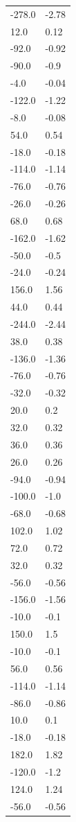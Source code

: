 \begin{longtable}{ll}
-278.0 & -2.78 \\
12.0 & 0.12 \\
-92.0 & -0.92 \\
-90.0 & -0.9 \\
-4.0 & -0.04 \\
-122.0 & -1.22 \\
-8.0 & -0.08 \\
54.0 & 0.54 \\
-18.0 & -0.18 \\
-114.0 & -1.14 \\
-76.0 & -0.76 \\
-26.0 & -0.26 \\
68.0 & 0.68 \\
-162.0 & -1.62 \\
-50.0 & -0.5 \\
-24.0 & -0.24 \\
156.0 & 1.56 \\
44.0 & 0.44 \\
-244.0 & -2.44 \\
38.0 & 0.38 \\
-136.0 & -1.36 \\
-76.0 & -0.76 \\
-32.0 & -0.32 \\
20.0 & 0.2 \\
32.0 & 0.32 \\
36.0 & 0.36 \\
26.0 & 0.26 \\
-94.0 & -0.94 \\
-100.0 & -1.0 \\
-68.0 & -0.68 \\
102.0 & 1.02 \\
72.0 & 0.72 \\
32.0 & 0.32 \\
-56.0 & -0.56 \\
-156.0 & -1.56 \\
-10.0 & -0.1 \\
150.0 & 1.5 \\
-10.0 & -0.1 \\
56.0 & 0.56 \\
-114.0 & -1.14 \\
-86.0 & -0.86 \\
10.0 & 0.1 \\
-18.0 & -0.18 \\
182.0 & 1.82 \\
-120.0 & -1.2 \\
124.0 & 1.24 \\
-56.0 & -0.56 \\

\end{longtable}
